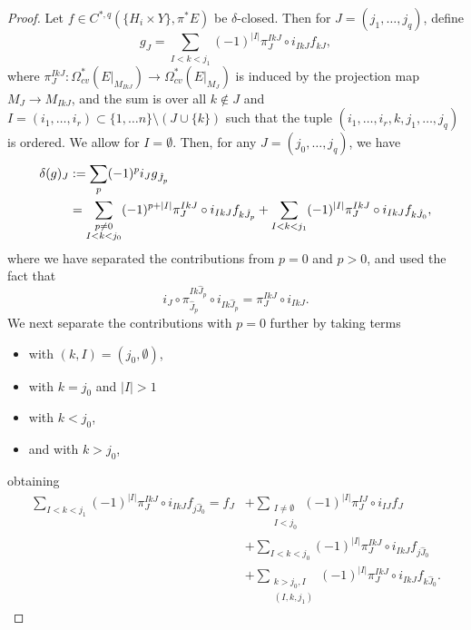 \documentclass[10pt,a4paper]{amsart}
\newcommand{\cl}{\colon}
\begin{document}
\begin{proof}
	Let $f \in C^{*,q}(\{H_i \times Y\}, \pi^*E)$ be $\delta$-closed. Then for $J = (j_1, \dots, j_q)$, define
	\begin{equation*}
		g_{J} = \sum_{I<k<j_1} (-1)^{|I|}\pi_{J}^{IkJ} \circ i_{IkJ} f_{kJ},
	\end{equation*}
	where $\pi_{J}^{IkJ}\cl \Omega^*_{cv}(E|_{M_{IkJ}}) \rightarrow \Omega^*_{cv}(E|_{M_{J}})$ is induced by the projection map $M_{J} \rightarrow M_{IkJ}$, and the sum is over all $k \notin J$ and $I = (i_1, \dots, i_r) \subset \{1, \dots n\} \setminus (J \cup \{k\})$ such that the tuple $(i_1, \dots, i_r, k, j_1, \dots, j_q)$ is ordered. We allow for $I =  \emptyset$. Then, for any $J = (j_0, \dots, j_q)$, we have 
	\begin{align}	\label{eq:terms with p>0}
		\notag\delta(g)_{J} &:= \sum_p (-1)^p i_{J} g_{\hat{J}_p}\\
		&= \sum_{\substack{p \neq 0\\I < k < j_0}} (-1)^{p+|I|} \pi_{J}^{IkJ} \circ i_{IkJ} f_{k\hat{J}_p}+ \sum_{I < k < j_1} (-1)^{|I|} \pi_{J}^{IkJ} \circ i_{IkJ} f_{k\hat{J}_0},
	\end{align}
	where we have separated the contributions from $p=0$ and $p >0$, and used the fact that 
	$$i_{J} \circ \pi_{\hat{J}_p}^{Ik \hat{J}_p} \circ i_{Ik \hat{J}_p} = \pi_{J}^{IkJ} \circ i_{Ik J}.$$ 
	We next separate the contributions with $p=0$ further by taking terms 
	\begin{itemize}
		\item with $(k,I) = (j_0, \emptyset)$,
		\item with $k = j_0$ and $|I| >1$
		\item with $k < j_0$,
		\item and with $k>j_0$,
	\end{itemize} 
	obtaining
	\begin{align}
		\sum_{I < k < j_1} (-1)^{|I|} \pi_{J}^{IkJ} \circ i_{IkJ} f_{j \hat{J}_0} = f_J
		&+\sum_{\substack{I\neq \emptyset\\I < j_0}} (-1)^{|I|} \pi_{J}^{IJ} \circ i_{IJ} f_{J} 
		\label{eq:terms with I nonempty and k = j0}\\
		&+\sum_{I < k < j_0} (-1)^{|I|} \pi_{J}^{IkJ} \circ i_{IkJ} f_{j \hat{J}_0}
		\label{eq:terms with k < j0}\\
		&+\sum_{\substack{k > j_0, I\\(I,k,j_1)}} (-1)^{|I|} \pi_{J}^{IkJ} \circ i_{IkJ}f_{k\hat{J}_0}.
		\label{eq:terms with k > j0}
	\end{align}

\end{proof}
\end{document}
